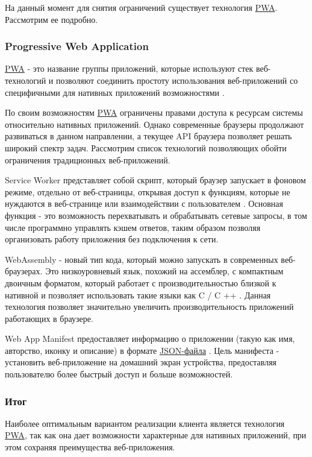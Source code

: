 На данный момент для снятия ограничений существует технология \hyperlink{pwa}{PWA}. Рассмотрим ее подробно.

\subsubsection{Progressive Web Application}

\hyperlink{pwa}{PWA} - это название группы приложений, которые используют стек веб-технологий и позволяют соединить простоту использования веб-приложений со специфичными для нативных приложений  возможностями \cite{progressive-web-applications}.

По своим возможностям \hyperlink{pwa}{PWA} ограничены правами доступа к ресурсам системы относительно нативных приложений.
Однако современные браузеры продолжают развиваться в данном направлении, а текущее API браузера позволяет решать широкий спектр задач.
Рассмотрим список технологий позволяющих обойти ограничения традиционных веб-приложений.

Service Worker представляет собой скрипт, который браузер запускает в фоновом режиме, отдельно от веб-страницы, открывая доступ к функциям, которые не нуждаются в веб-странице или взаимодействии с пользователем \cite{service-worker}.
Основная функция - это возможность перехватывать и обрабатывать сетевые запросы, в том числе программно управлять кэшем ответов, таким образом позволяя организовать работу приложения без подключения к сети.

WebAssembly - новый тип кода, который можно запускать в современных веб-браузерах. Это низкоуровневый язык, похожий на ассемблер, с компактным двоичным форматом, который работает с производительностью близкой к нативной и позволяет использовать такие языки как C / C ++ \cite{web-assembly}.
Данная технология позволяет значительно увеличить производительность приложений работающих в браузере.

Web App Manifest предоставляет информацию о приложении (такую как имя, авторство, иконку и описание) в формате \hyperlink{json}{JSON-файла} \cite{web-app-manifest}.
Цель манифеста - установить веб-приложение на домашний экран устройства, предоставляя пользователю более быстрый доступ и больше возможностей.

\subsubsection{Итог}

Наиболее оптимальным вариантом реализации клиента является технология \hyperlink{pwa}{PWA}, так как она дает возможности характерные для нативных приложений, при этом сохраняя преимущества веб-приложения.

